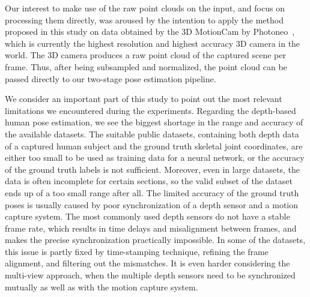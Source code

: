 \noindent
Our interest to make use of the raw point clouds on the input, and focus on processing them directly, was aroused by the intention to apply the method proposed in this study on data obtained by the 3D MotionCam by Photoneo~\cite{photoneo}, which is currently the highest resolution and highest accuracy 3D camera in the world. The 3D camera produces a raw point cloud of the captured scene per frame. Thus, after being subsampled and normalized, the point cloud can be passed directly to our two-stage pose estimation pipeline.\par

\vspace{5mm}
\noindent
We consider an important part of this study to point out the most relevant limitations we encountered during the experiments. Regarding the depth-based human pose estimation, we see the biggest shortage in the range and accuracy of the available datasets. The suitable public datasets, containing both depth data of a captured human subject and the ground truth skeletal joint coordinates, are either too small to be used as training data for a neural network, or the accuracy of the ground truth labels is not sufficient. Moreover, even in large datasets, the data is often incomplete for certain sections, so the valid subset of the dataset ends up of a too small range after all. The limited accuracy of the ground truth poses is usually caused by poor synchronization of a depth sensor and a motion capture system. The most commonly used depth sensors do not have a stable frame rate, which results in time delays and misalignment between frames, and makes the precise synchronization practically impossible. In some of the datasets, this issue is partly fixed by time-stamping technique, refining the frame alignment, and filtering out the mismatches. It is even harder considering the multi-view approach, when the multiple depth sensors need to be synchronized mutually as well as with the motion capture system.\par
\vspace{5mm}
\noindent
